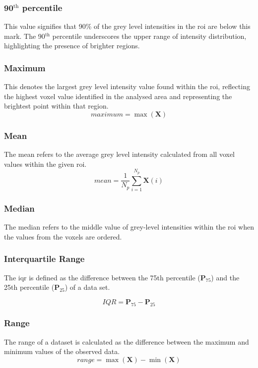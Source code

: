 \subsubsection*{90$^{\text{th}}$ percentile}
This value signifies that 90\% of the grey level intensities in the \ac{roi} are below this mark.
The 90$^{\text{th}}$ percentile underscores the upper range of intensity distribution, highlighting the presence of brighter regions.  

\subsubsection*{Maximum}
 This denotes the largest grey level intensity value found within the \ac{roi}, reflecting the highest voxel value identified in the analysed area and representing the brightest point within that region.  
\begin{equation}
    \textit{maximum} = \max(\textbf{X})
\end{equation}

\subsubsection*{Mean}
The mean refers to the average grey level intensity calculated from all voxel values within the given \ac{roi}.
\begin{equation}
    \textit{mean} = \frac{1}{N_p}\displaystyle\sum^{N_p}_{i=1}{\textbf{X}(i)}
\end{equation}

\subsubsection*{Median}
The median refers to the middle value of grey-level intensities within the \ac{roi} when the values from the voxels are ordered. 

\subsubsection*{Interquartile Range}
The \acf{iqr} is defined as the difference between the 75th percentile ($\mathbf{P}_{75}$) and the 25th percentile  ($\mathbf{P}_{25}$) of a data set. 

\begin{equation}
    \textit{IQR} = \textbf{P}_{75} - \textbf{P}_{25}
\end{equation}



\subsubsection*{Range}
The range of a dataset is calculated as the difference between the maximum and minimum values of the observed data.
\begin{equation}
    \textit{range} = \max(\textbf{X}) - \min(\textbf{X})
\end{equation}

